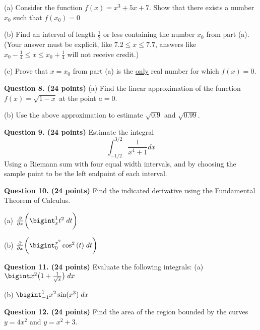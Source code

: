 \documentclass[11pt]{article}
\begin{document}
(a) Consider the function $f(x) = x^3 + 5x +7$. Show that there exists 
a number $x_0$ such that $f(x_0) = 0$

\vspace{6.5cm}

(b) Find an interval of length $\frac{1}{2}$ or less containing the 
number $x_0$ from part (a). (Your answer must be explicit, like 
$7.2 \leq x \leq 7.7$, answers like $x_0 -\frac{1}{4} \leq x
\leq x_0 + \frac{1}{4}$ will not receive credit.)

\vspace{6.5cm}

(c) Prove that $x=x_0$ from part (a) is the \underline{only} real number
for which $f(x)=0$. 

\newpage

\textbf{\large Question 8. (24 points)}
\newline
(a) Find the linear approximation of the function $f(x)= \sqrt{1-x}$ at 
the point $a=0$. 

\vspace{10cm}

(b) Use the above approximation to estimate $\sqrt{0.9}$ and $\sqrt{0.99}$.


\newpage

\textbf{\large Question 9. (24 points)} Estimate the integral
$$\int_{-1/2}^{3/2} \frac{1}{x^4+1}dx$$
Using a Riemann sum with four equal width intervals, and by choosing the 
sample point to be the left endpoint of each interval. 
\newline

\newpage

\textbf{\large Question 10. (24 points)} Find the indicated derivative 
using the Fundamental \newline Theorem of Calculus. 

(a) $\frac{\partial}{\partial x} \bigg{(} \bigint_x^1 t^2 \; dt \bigg{)}$

\vspace{4cm}
(b) $\frac{\partial}{\partial x} \bigg{(} \bigint_0^{x^2} \cos^2{(t)} \;dt
\bigg{)}$

\vspace{4cm}

\textbf{\large Question 11. (24 points)} Evaluate the following integrals:
\newline
(a) $\bigint x^2 \big{(} 1+{\frac{1}{\sqrt{x}} \big{)}\;dx}$

\vspace{4cm}

(b) $\bigint_{-1}^{1} x^2\sin(x^3) \;dx$

\newpage

\textbf{\large Question 12. (24 points)} Find the area of the region bounded 
by the curves $y=4x^2$ and $y=x^2+3$.
\end{document}
